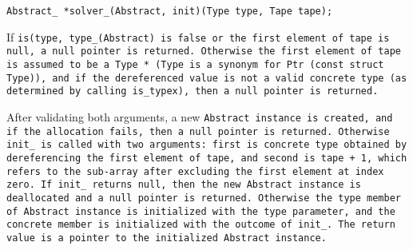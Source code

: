 
\tt{Abstract_ *solver_(Abstract, init)(Type type, Tape tape);}


If \tt{is(type, type_(Abstract)} is \tt{false} or the first
element of \tt{tape} is null, a null pointer is returned.
Otherwise the first element of \tt{tape} is assumed to be a \tt{Type *}
(\tt{Type} is a synonym for \tt{Ptr (const struct Type)}),
and if the dereferenced value is not a valid concrete type
(as determined by calling \tt{is_typex}), then a null pointer is returned.

After validating both arguments, a new \tt{Abstract} instance is created,
and if the allocation fails, then a null pointer is returned.
Otherwise \tt{init_} is called with two arguments:
first is concrete type obtained by dereferencing the first element
of \tt{tape}, and second is \tt{tape + 1}, which refers to the
sub-array after excluding the first element at index zero.
If \tt{init_} returns null, then the new \tt{Abstract}
instance is deallocated and a null pointer is returned.
Otherwise the \tt{type} member of \tt{Abstract} instance is
initialized with the \tt{type} parameter, and the \tt{concrete}
member is initialized with the outcome of \tt{init_}.
The return value is a pointer to the initialized \tt{Abstract} instance.
